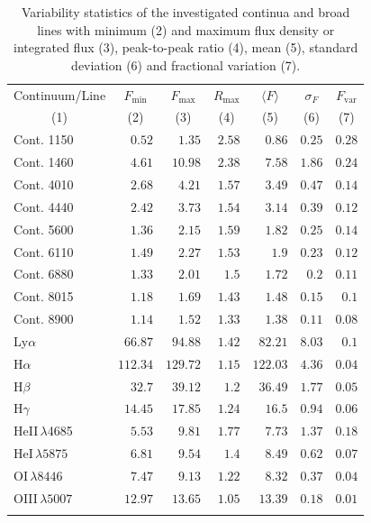 \begin{table}[!htb] 
	\centering 
	\caption{Variability statistics of the investigated continua and broad lines with minimum (2) and maximum flux density or integrated flux (3), peak-to-peak ratio (4), mean (5), standard deviation (6) and fractional variation (7).} 
	\begin{tabular}{lrrrrrr} 
		\hline 
		\hline 
		Continuum/Line &  \multicolumn{1}{c}{$F_{\text{min}}$} &  \multicolumn{1}{c}{$F_{\text{max}}$} &  \multicolumn{1}{c}{$R_{\text{max}}$} &  \multicolumn{1}{c}{$\langle F \rangle$} &  \multicolumn{1}{c}{$\sigma_F$} &  \multicolumn{1}{c}{$F_{\text{var}}$} \\ 
		\multicolumn{1}{c}{(1)} & \multicolumn{1}{c}{(2)} & \multicolumn{1}{c}{(3)} & \multicolumn{1}{c}{(4)} & \multicolumn{1}{c}{(5)} & \multicolumn{1}{c}{(6)} & \multicolumn{1}{c}{(7)} \\ 
		\hline 
		Cont. 1150  & $0.52$ & $1.35$ & $2.58$ & $0.86$ & $0.25$ & $0.28$ \\
		Cont. 1460  & $4.61$ & $10.98$ & $2.38$ & $7.58$ & $1.86$ & $0.24$ \\
		Cont. 4010  & $2.68$ & $4.21$ & $1.57$ & $3.49$ & $0.47$ & $0.14$ \\
		Cont. 4440  & $2.42$ & $3.73$ & $1.54$ & $3.14$ & $0.39$ & $0.12$ \\
		Cont. 5600  & $1.36$ & $2.15$ & $1.59$ & $1.82$ & $0.25$ & $0.14$ \\
		Cont. 6110  & $1.49$ & $2.27$ & $1.53$ & $1.9$ & $0.23$ & $0.12$ \\
		Cont. 6880  & $1.33$ & $2.01$ & $1.5$ & $1.72$ & $0.2$ & $0.11$ \\
		Cont. 8015  & $1.18$ & $1.69$ & $1.43$ & $1.48$ & $0.15$ & $0.1$ \\
		Cont. 8900  & $1.14$ & $1.52$ & $1.33$ & $1.38$ & $0.11$ & $0.08$ \\
		\hline 
		Ly$\alpha$  & $66.87$ & $94.88$ & $1.42$ & $82.21$ & $8.03$ & $0.1$ \\
		H$\alpha$  & $112.34$ & $129.72$ & $1.15$ & $122.03$ & $4.36$ & $0.04$ \\
		H$\beta$  & $32.7$ & $39.12$ & $1.2$ & $36.49$ & $1.77$ & $0.05$ \\
		H$\gamma$  & $14.45$ & $17.85$ & $1.24$ & $16.5$ & $0.94$ & $0.06$ \\
		HeII$\,\lambda$4685  & $5.53$ & $9.81$ & $1.77$ & $7.73$ & $1.37$ & $0.18$ \\
		HeI$\,\lambda5875$  & $6.81$ & $9.54$ & $1.4$ & $8.49$ & $0.62$ & $0.07$ \\
		OI$\,\lambda 8446$ & $7.47$ & $9.13$ & $1.22$ & $8.32$ & $0.37$ & $0.04$ \\
		\hline
		OIII$\,\lambda 5007$  & $12.97$ & $13.65$ & $1.05$ & $13.39$ & $0.18$ & $0.01$ \\
		\hline 
		\hline 
		\label{tab:varstatistics} 
	\end{tabular} 
	
\end{table}



